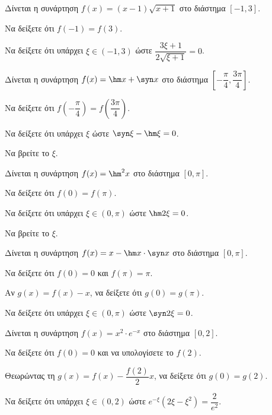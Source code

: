 \documentclass[11pt,a4paper,modern]{FFExercises}
\begin{document}
\askhsh
Δίνεται η συνάρτηση $f(x) = (x-1)\sqrt{x+1}$ στο διάστημα $[-1, 3]$.
\begin{alist}
  \item Να δείξετε ότι $f(-1) = f(3)$.
  \item Να δείξετε ότι υπάρχει $\xi \in (-1, 3)$ ώστε $\dfrac{3\xi + 1}{2\sqrt{\xi+1}} = 0$.
\end{alist}


\askhsh
Δίνεται η συνάρτηση $f(x) = \hm x + \syn x$ στο διάστημα $\left[-\dfrac{\pi}{4}, \dfrac{3\pi}{4}\right]$.
\begin{alist}
  \item Να δείξετε ότι $f\left(-\dfrac{\pi}{4}\right) = f\left(\dfrac{3\pi}{4}\right)$.
  \item Να δείξετε ότι υπάρχει $\xi$ ώστε $\syn\xi - \hm\xi = 0$.
  \item Να βρείτε το $\xi$.
\end{alist}

\askhsh
Δίνεται η συνάρτηση $f(x) = \hm^2 x$ στο διάστημα $[0, \pi]$.
\begin{alist}
  \item Να δείξετε ότι $f(0) = f(\pi)$.
  \item Να δείξετε ότι υπάρχει $\xi \in (0, \pi)$ ώστε $\hm 2\xi = 0$.
  \item Να βρείτε το $\xi$.
\end{alist}

\askhsh
Δίνεται η συνάρτηση $f(x) = x - \hm x \cdot \syn x$ στο διάστημα $[0, \pi]$.
\begin{alist}
  \item Να δείξετε ότι $f(0) = 0$ και $f(\pi) = \pi$.
  \item Αν $g(x) = f(x) - x$, να δείξετε ότι $g(0) = g(\pi)$.
  \item Να δείξετε ότι υπάρχει $\xi \in (0, \pi)$ ώστε $\syn 2\xi = 0$.
\end{alist}


\askhsh
Δίνεται η συνάρτηση $f(x) = x^2 \cdot e^{-x}$ στο διάστημα $[0, 2]$.
\begin{alist}
  \item Να δείξετε ότι $f(0) = 0$ και να υπολογίσετε το $f(2)$.
  \item Θεωρώντας τη $g(x) = f(x) - \dfrac{f(2)}{2}x$, να δείξετε ότι $g(0) = g(2)$.
  \item Να δείξετε ότι υπάρχει $\xi \in (0, 2)$ ώστε $e^{-\xi}(2\xi - \xi^2) = \dfrac{2}{e^2}$.
\end{alist}
\end{document}
